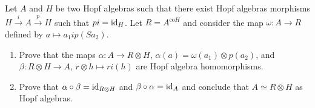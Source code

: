 \begin{exercise}
Let $A$ and $H$ be two Hopf algebras such that there exist Hopf algebras
morphisms $H\xrightarrow{i}A\xrightarrow{p}H$ such that $pi=\mathrm{id}_H$. Let
$R=A^{\mathrm{co}H}$ and consider the map $\omega:A\to R$ defined by $a\mapsto
a_1ip(Sa_2)$. 
\begin{enumerate}
    \item Prove that the maps $\alpha:A\to R\otimes H$, $\alpha(a)=\omega(a_1)\otimes p(a_2)$, and 
    $\beta:R\otimes H\to A$, $r\otimes h\mapsto ri(h)$     
    are Hopf algebra homomorphisms. 
    \item Prove that $\alpha\circ\beta=\mathrm{id}_{R\otimes H}$ and $\beta\circ\alpha=\mathrm{id}_A$ and 
    conclude that $A\simeq R\otimes H$ as Hopf algebras.
\end{enumerate}
\end{exercise}
